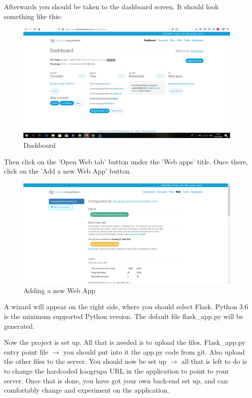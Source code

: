				Afterwards you should be taken to the dashboard screen. It should look something like this:
				\begin{figure}[H]
					\includegraphics[width=\linewidth]{images/Deploy_2.png}
					\caption{Dashboard}
					\label{fig:deployment_2}
				\end{figure}
				
				Then click on the 'Open Web tab' button under the 'Web apps' title. Once there, click on the 'Add a new Web App' button.
				\begin{figure}[H]
					\includegraphics[width=\linewidth]{images/Deploy_3.png}
					\caption{Adding a new Web App}
					\label{fig:deployment_3}
				\end{figure}
				
				A wizard will appear on the right side, where you should select Flask. Python 3.6 is the minimum supported Python version. The default file flask\_app.py will be generated. 
				
				Now the project is set up. All that is needed is to upload the files. Flask\_app.py entry point file $\rightarrow$ you should put into it the app.py code from git. Also upload the other files to the server. You should now be set up $\rightarrow$ all that is left to do is to change the hardcoded kaogrupa URL in the application to point to your server. Once that is done, you have got your own back-end set up, and can comfortably change and experiment on the application.
				
